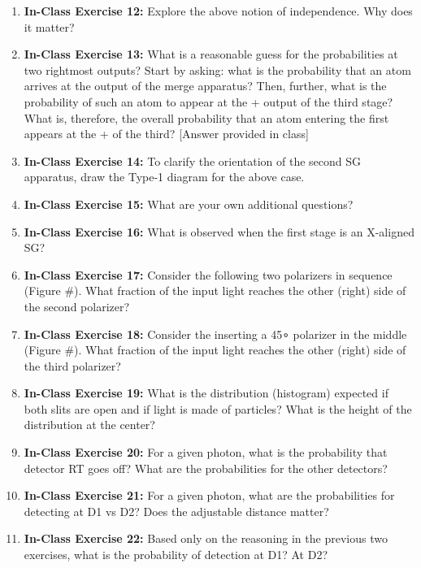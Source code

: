 \documentclass[main.tex]{subfiles}
\begin{document}
\begin{enumerate}
\item[] \textbf{In-Class Exercise 12:} Explore the above notion of independence. Why does it matter?

\item[] \textbf{In-Class Exercise 13:} What is a reasonable guess for the probabilities at two rightmost outputs? Start by asking: what is the probability that an atom arrives at the output of the merge apparatus? Then, further, what is the probability of such an atom to appear at the + output of the third stage? What is, therefore, the overall probability that an atom entering the first appears at the + of the third?
[Answer provided in class]

\item[] \textbf{In-Class Exercise 14:} To clarify the orientation of the second SG apparatus, draw the Type-1 diagram for the above case.

\item[] \textbf{In-Class Exercise 15:} What are your own additional questions?

\item[] \textbf{In-Class Exercise 16:} What is observed when the first stage is an X-aligned SG?

\item[] \textbf{In-Class Exercise 17:} Consider the following two polarizers in sequence (Figure #). What fraction of the input light reaches the other (right) side of the second polarizer?

\item[] \textbf{In-Class Exercise 18:} Consider the inserting a 45∘ polarizer in the middle (Figure #). What fraction of the input light reaches the other (right) side of the third polarizer?

\item[] \textbf{In-Class Exercise 19:} What is the distribution (histogram) expected if both slits are open and if light is made of particles? What is the height of the distribution at the center?

\item[] \textbf{In-Class Exercise 20:} For a given photon, what is the probability that detector RT goes off? What are the probabilities for the other detectors?

\item[] \textbf{In-Class Exercise 21:} For a given photon, what are the probabilities for detecting at D1 vs D2? Does the adjustable distance matter?

\item[] \textbf{In-Class Exercise 22:} Based only on the reasoning in the previous two exercises, what is the probability of detection at D1? At D2?

\end{enumerate}
\end{document}
